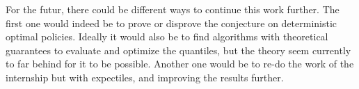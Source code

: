 \documentclass[11pt,a4paper]{article}
\begin{document}
For the futur, there could be different ways to continue this work further. The first one would indeed be to prove or disprove the conjecture on deterministic optimal policies. Ideally it would also be to find algorithms with theoretical guarantees to evaluate and optimize the quantiles, but the theory seem currently to far behind for it to be possible. Another one would be to re-do the work of the internship but with expectiles, and improving the results further.


\newpage

 

\end{document}
